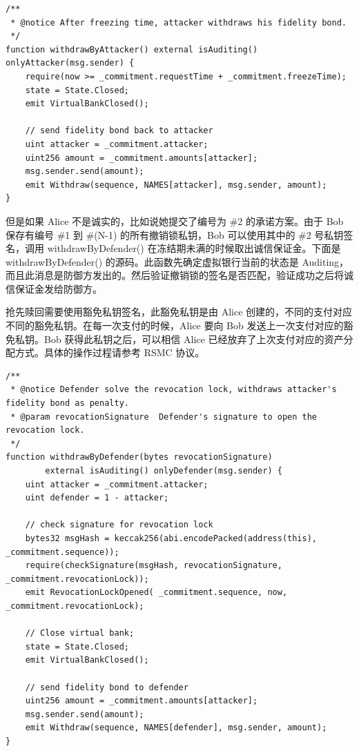 \begin{appendices}
\begin{lstlisting}[caption={锁定时间过后，进攻方取回诚信保证金}, label={lst:withdrawByAttacker}]
/**
 * @notice After freezing time, attacker withdraws his fidelity bond.
 */
function withdrawByAttacker() external isAuditing() onlyAttacker(msg.sender) {
    require(now >= _commitment.requestTime + _commitment.freezeTime);
    state = State.Closed;
    emit VirtualBankClosed();

    // send fidelity bond back to attacker
    uint attacker = _commitment.attacker;
    uint256 amount = _commitment.amounts[attacker];
    msg.sender.send(amount);
    emit Withdraw(sequence, NAMES[attacker], msg.sender, amount);
}
\end{lstlisting}

但是如果 Alice 不是诚实的，比如说她提交了编号为 \#2 的承诺方案。由于 Bob 保存有编号 \#1 到 \#(N-1) 的所有撤销锁私钥，Bob 可以使用其中的 \#2 号私钥签名，调用 withdrawByDefender() 在冻结期未满的时候取出诚信保证金。下面是 withdrawByDefender() 的源码。此函数先确定虚拟银行当前的状态是 Auditing，而且此消息是防御方发出的。然后验证撤销锁的签名是否匹配，验证成功之后将诚信保证金发给防御方。

抢先赎回需要使用豁免私钥签名，此豁免私钥是由 Alice 创建的，不同的支付对应不同的豁免私钥。在每一次支付的时候，Alice 要向 Bob 发送上一次支付对应的豁免私钥。Bob 获得此私钥之后，可以相信 Alice 已经放弃了上次支付对应的资产分配方式。具体的操作过程请参考 RSMC 协议。

\begin{lstlisting}[caption={锁定时间内，防御方取出诚信保证金}, label={lst:withdrawByDefender}]
/**
 * @notice Defender solve the revocation lock, withdraws attacker's fidelity bond as penalty.
 * @param revocationSignature  Defender's signature to open the revocation lock.
 */
function withdrawByDefender(bytes revocationSignature) 
        external isAuditing() onlyDefender(msg.sender) {
    uint attacker = _commitment.attacker;
    uint defender = 1 - attacker;
    
    // check signature for revocation lock
    bytes32 msgHash = keccak256(abi.encodePacked(address(this), _commitment.sequence));
    require(checkSignature(msgHash, revocationSignature, _commitment.revocationLock));
    emit RevocationLockOpened( _commitment.sequence, now, _commitment.revocationLock);
    
    // Close virtual bank;
    state = State.Closed;
    emit VirtualBankClosed();
    
    // send fidelity bond to defender
    uint256 amount = _commitment.amounts[attacker];
    msg.sender.send(amount);
    emit Withdraw(sequence, NAMES[defender], msg.sender, amount);
}
\end{lstlisting}


\end{appendices}
